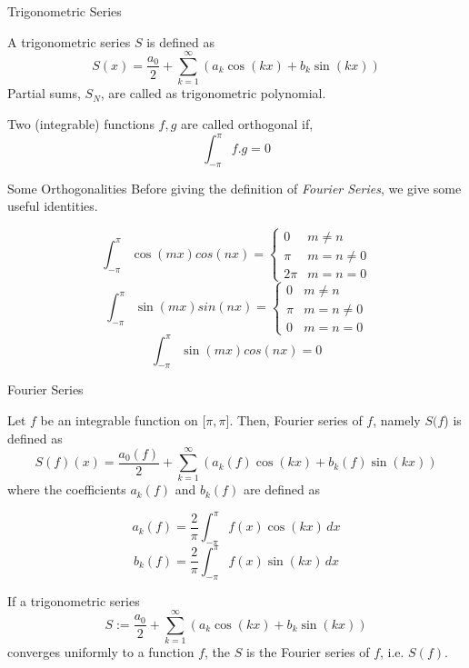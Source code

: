 \documentclass{beamer}
\begin{document}
\begin{frame}{Trigonometric Series}
\small
    \begin{definition}
        A trigonometric series $S$ is defined as
        \[
        S(x) = \frac{a_0}{2} +  \sum_{k = 1}^{\infty} (a_k  \cos(kx) + b_k  \sin(kx))
        \]
        Partial sums, $S_N$, are called as trigonometric polynomial.

    \end{definition}
    \begin{definition}[Orthogonality]
        Two (integrable) functions $f, g$ are called orthogonal if,
        \[
        \int_{-\pi}^{\pi}f.g = 0
        \]
    \end{definition}

\end{frame}
\begin{frame}{Some Orthogonalities}
\small
    Before giving the definition of \textit{Fourier Series}, we give some useful identities.

    \[
    \int_{-\pi}^{\pi} \cos(mx)cos(nx) = \begin{cases}
                                        0 & m \neq n \\
                                      \pi &  m = n \neq 0\\
                                     2\pi & m = n = 0
                                        \end{cases}
    \]
    \[
    \int_{-\pi}^{\pi} \sin(mx)sin(nx) = \begin{cases}
                                        0 & m \neq n \\
                                      \pi &  m = n \neq 0\\
                                        0 & m = n = 0
                                        \end{cases}
    \]
    \[
    \int_{-\pi}^{\pi} \sin(mx)cos(nx) = 0
    \]
\end{frame}
\begin{frame}[shrink=9]{Fourier Series}
\small
    \begin{definition}
        Let \(f\) be an integrable function on [$\pi, \pi$]. Then, Fourier series of \(f\), namely $S($\(f\)) is defined as
    \[
    S(f)(x) = \frac{a_0(f)}{2} +  \sum_{k = 1}^{\infty} (a_k(f)  \cos(kx) + b_k(f)  \sin(kx))
    \]
    where the coefficients $a_k(f)$ and $b_k(f)$ are defined as

    \[
    a_k(f) = \frac{2}{\pi}\int_{-\pi}^{\pi} f(x) \cos(kx)\,dx
    \]
    \[
    b_k(f) = \frac{2}{\pi}\int_{-\pi}^{\pi} f(x) \sin(kx)\,dx
    \]
    \end{definition}

    \begin{theorem}[Fourier]
    If a trigonometric series
    \[
    S := \frac{a_0}{2} +  \sum_{k = 1}^{\infty} (a_k  \cos(kx) + b_k  \sin(kx))
    \]
   converges uniformly to a function \(f\), the $S$ is the Fourier series of \(f\), i.e. $S(f)$.
\end{theorem}
\end{frame}
\end{document}
